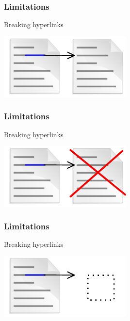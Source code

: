 \begin{frame}
\frametitle{Limitations}
	\begin{block}{Breaking hyperlinks}
		\begin{center}
			\includegraphics[width=0.5\textwidth]{./images/pageDeleted.png}
		\end{center}
	\end{block}
\end{frame}

\begin{frame}
\frametitle{Limitations}
	\begin{block}{Breaking hyperlinks}
		\begin{center}
			\includegraphics[width=0.5\textwidth]{./images/pageDeleted2.png}
		\end{center}
	\end{block}
\end{frame}


\begin{frame}
\frametitle{Limitations}
	\begin{block}{Breaking hyperlinks}
		\begin{center}
			\includegraphics[width=0.5\textwidth]{./images/pageDeleted3.png}
		\end{center}
	\end{block}
\end{frame}

